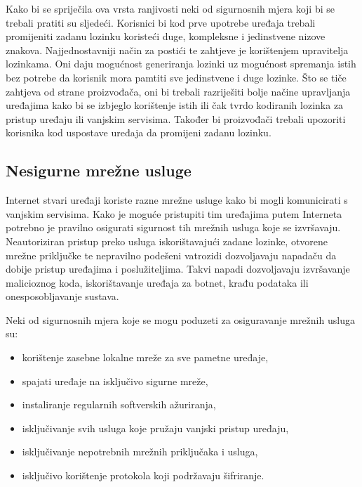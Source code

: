 \documentclass[times, utf8, diplomski]{fer}
\begin{document}
Kako bi se spriječila ova vrsta ranjivosti neki od sigurnosnih mjera koji bi se trebali pratiti su sljedeći. Korisnici bi kod prve upotrebe uređaja trebali promijeniti zadanu lozinku koristeći duge, kompleksne i jedinstvene nizove znakova. Najjednostavniji način za postići te zahtjeve je korištenjem upravitelja lozinkama. Oni daju mogućnost generiranja lozinki uz mogućnost spremanja istih bez potrebe da korisnik mora pamtiti sve jedinstvene i duge lozinke. Što se tiče zahtjeva od strane proizvođača, oni bi trebali razriješiti bolje načine upravljanja uređajima kako bi se izbjeglo korištenje istih ili čak tvrdo kodiranih lozinka za pristup uređaju ili vanjskim servisima. Također bi proizvođači trebali upozoriti korisnika kod uspostave uređaja da promijeni zadanu lozinku.

\subsection{Nesigurne mrežne usluge}
Internet stvari uređaji koriste razne mrežne usluge kako bi mogli komunicirati s vanjskim servisima. Kako je moguće pristupiti tim uređajima putem Interneta potrebno je pravilno osigurati sigurnost tih mrežnih usluga koje se izvršavaju. Neautoriziran pristup preko usluga iskorištavajući zadane lozinke, otvorene mrežne priključke te nepravilno podešeni vatrozidi dozvoljavaju napadaču da dobije pristup uređajima i poslužiteljima. Takvi napadi dozvoljavaju izvršavanje malicioznog koda, iskorištavanje uređaja za botnet, krađu podataka ili onesposobljavanje sustava.

Neki od sigurnosnih mjera koje se mogu poduzeti za osiguravanje mrežnih usluga su: \begin{itemize}
    \item korištenje zasebne lokalne mreže za sve pametne uređaje,
    \item spajati uređaje na isključivo sigurne mreže,
    \item instaliranje regularnih softverskih ažuriranja,
    \item isključivanje svih usluga koje pružaju vanjski pristup uređaju,
    \item isključivanje nepotrebnih mrežnih priključaka i usluga,
    \item isključivo korištenje protokola koji podržavaju šifriranje.
\end{itemize}
\end{document}
